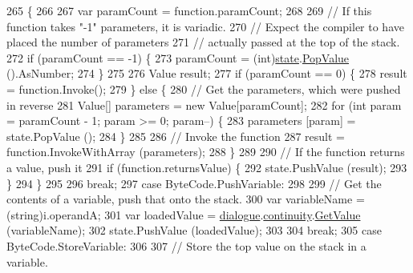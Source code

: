 \begin{DoxyCode}
265                 \{
266 
267                     var paramCount = function.paramCount;
268 
269                     \textcolor{comment}{// If this function takes "-1" parameters, it is variadic.}
270                     \textcolor{comment}{// Expect the compiler to have placed the number of parameters}
271                     \textcolor{comment}{// actually passed at the top of the stack.}
272                     \textcolor{keywordflow}{if} (paramCount == -1) \{
273                         paramCount = (int)\hyperlink{a00136_a70f2ce6201cdd2430ceaa764ac614ca0}{state}.\hyperlink{a00139_a36881a888ea2839d74c3d4e7c199f4ee}{PopValue} ().AsNumber;
274                     \}
275 
276                     Value result;
277                     \textcolor{keywordflow}{if} (paramCount == 0) \{
278                         result = function.Invoke();
279                     \} \textcolor{keywordflow}{else} \{
280                         \textcolor{comment}{// Get the parameters, which were pushed in reverse}
281                         Value[] parameters = \textcolor{keyword}{new} Value[paramCount];
282                         \textcolor{keywordflow}{for} (\textcolor{keywordtype}{int} param = paramCount - 1; param >= 0; param--) \{
283                             parameters [param] = state.PopValue ();
284                         \}
285 
286                         \textcolor{comment}{// Invoke the function}
287                         result = function.InvokeWithArray (parameters);
288                     \}
289 
290                     \textcolor{comment}{// If the function returns a value, push it}
291                     \textcolor{keywordflow}{if} (\textcolor{keyword}{function}.returnsValue) \{
292                         state.PushValue (result);
293                     \}
294                 \}
295 
296                 \textcolor{keywordflow}{break};
297             \textcolor{keywordflow}{case} ByteCode.PushVariable:
298 
299                 \textcolor{comment}{// Get the contents of a variable, push that onto the stack.}
300                 var variableName = (string)i.operandA;
301                 var loadedValue = \hyperlink{a00136_ac506426c503da5f033247c29e11c5e82}{dialogue}.\hyperlink{a00070_ae94eaa4b03b432422f5d205fabe37ff5}{continuity}.\hyperlink{a00164_accab1fc5c8fc353dbfc53ca0f4029576}{GetValue} (variableName);
302                 state.PushValue (loadedValue);
303 
304                 \textcolor{keywordflow}{break};
305             \textcolor{keywordflow}{case} ByteCode.StoreVariable:
306 
307                 \textcolor{comment}{// Store the top value on the stack in a variable.}

\end{DoxyCode}
